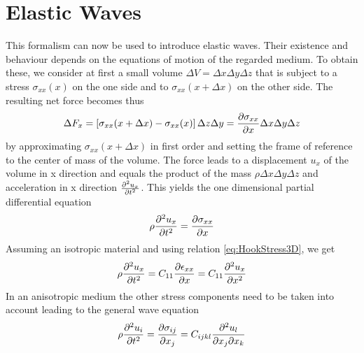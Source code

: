\section{Elastic Waves}
This formalism can now be used to introduce elastic waves. Their existence and
behaviour depends on the equations of motion of the regarded medium. To obtain
these, we consider at first a small volume $\Delta V = \Delta x \Delta y
    \Delta z$ that is subject to a stress $\sigma_{xx}(x)$ on the one side and
to $\sigma_{xx}(x+\Delta x)$ on the other side. The resulting net force becomes
thus
\begin{equation}
    \Delta F_x = \left[ \sigma_{xx}(x+\Delta x)- \sigma_{xx}(x) \right] \Delta
    z \Delta y = \frac{\partial \sigma_{xx}}{\partial x} \Delta x \Delta y \Delta z
\end{equation}
by approximating $\sigma_{xx}(x+\Delta x)$ in first order and setting the frame
of reference to the center of mass of the volume.
The force leads to a displacement $u_x$ of the volume in x direction and equals
the
product of the mass $\rho\Delta x \Delta y \Delta z$ and acceleration in x
direction $\frac{\partial^2 u_x}{\partial t^2}$. This yields the one dimensional partial
differential equation
\begin{equation}
    \rho \frac{\partial^2 u_x}{\partial t^2} = \frac{\partial \sigma_{xx}}{\partial x}
\end{equation}
Assuming an isotropic material and using relation \ref{eq:HookStress3D}, we
get
\begin{equation}
    \rho \frac{\partial^2 u_x}{\partial t^2} = C_{11} \frac{\partial \epsilon_{xx}}{\partial x} = C_{11}\frac{\partial^2 u_x}{\partial x^2}
\end{equation}
In an anisotropic medium the other stress components need to be taken into
account leading to the general wave equation
\begin{equation} \label{eq:wave_eq}
    \rho \frac{\partial^2 u_i}{\partial t^2} = \frac{\partial \sigma_{ij}}{\partial x_j} = C_{ijkl}
    \frac{\partial^2 u_l}{\partial x_j \partial x_k}
\end{equation}


